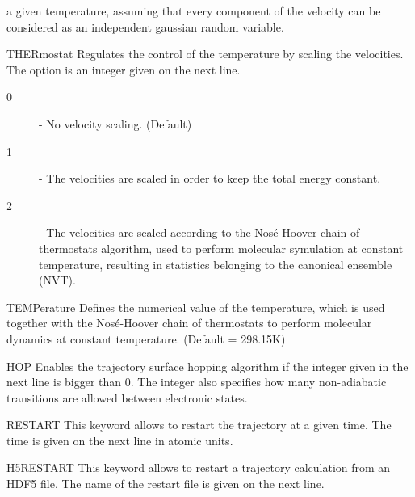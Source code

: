 \begin{keywordlist}
$$\begin{description}
a given temperature, assuming that every component of the velocity can be considered as an independent gaussian random variable.
\end{description}
\item[THERmostat]
Regulates the control of the temperature by scaling the velocities. The option
is an integer given on the next line.
\begin{description}
\item[{\mdseries{ }0}] - No velocity scaling. (Default)
\item[{\mdseries{ }1}] - The velocities are scaled in order to keep the total energy constant.
\item[{\mdseries{ }2}] - The velocities are scaled according to the Nos\'e-Hoover chain of thermostats algorithm, used to perform molecular symulation at
constant temperature, resulting in statistics belonging to the canonical ensemble (NVT).
\end{description}
\item[TEMPerature]
Defines the numerical value of the temperature, which is used together with the Nos\'e-Hoover
chain of thermostats to perform molecular dynamics at constant temperature. (Default = 298.15K)
\item[HOP]
Enables the trajectory surface hopping algorithm if the integer given in
the next line is bigger than 0. The integer also specifies how many
non-adiabatic transitions are allowed between electronic states.
\item[RESTART]
This keyword allows to restart the trajectory at a given time.
The time is given on the next line in atomic units.
\item[H5RESTART]
This keyword allows to restart a trajectory calculation from an HDF5 file.
The name of the restart file is given on the next line.
\end{keywordlist}

